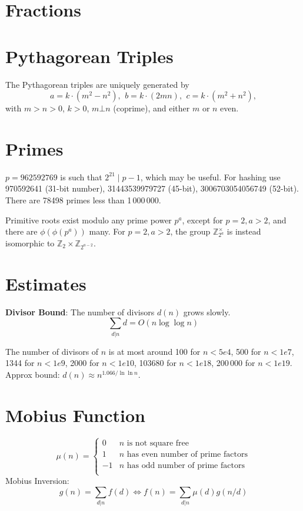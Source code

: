 \section{Fractions}

\section{Pythagorean Triples}
	The Pythagorean triples are uniquely generated by
	\[ a=k\cdot (m^{2}-n^{2}),\ \,b=k\cdot (2mn),\ \,c=k\cdot (m^{2}+n^{2}), \]
	with $m > n > 0$, $k > 0$, $m \bot n$ (coprime), and either $m$ or $n$ even.

\section{Primes}
	$p=962592769$ is such that $2^{21} \mid p-1$, which may be useful. For hashing
	use 970592641 (31-bit number), 31443539979727 (45-bit), 3006703054056749
	(52-bit). There are 78498 primes less than 1\,000\,000.

	Primitive roots exist modulo any prime power $p^a$, except for $p = 2, a > 2$, and there are $\phi(\phi(p^a))$ many.
	For $p = 2, a > 2$, the group $\mathbb Z_{2^a}^\times$ is instead isomorphic to $\mathbb Z_2 \times \mathbb Z_{2^{a-2}}$.

\section{Estimates}
	\textbf{Divisor Bound}: The number of divisors $d(n)$ grows slowly.
	\[ \sum_{d|n} d = O(n \log \log n) \]

	The number of divisors of $n$ is at most around 100 for $n < 5e4$, 500 for $n < 1e7$, 1344 for $n < 1e9$, 2000 for $n < 1e10$, 103680 for $n < 1e18$, 200\,000 for $n < 1e19$.
	Approx bound: $d(n) \approx n^{1.066/\ln \ln n}$.

\section{Mobius Function}
\[
	\mu(n) = \begin{cases} 0 & n \textrm{ is not square free}\\ 1 & n \textrm{ has even number of prime factors}\\ -1 & n \textrm{ has odd number of prime factors}\\\end{cases}
\]
  Mobius Inversion:
  \[ g(n) = \sum_{d|n} f(d) \Leftrightarrow f(n) = \sum_{d|n} \mu(d)g(n/d) \]

